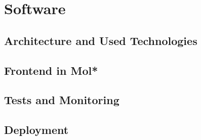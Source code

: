 \chapter{Software}
\label{chap:software}



\section{Architecture and Used Technologies}
\label{sec:architecture-technologies}



\section{Frontend in Mol*}
\label{sec:frontend-molstar}



\section{Tests and Monitoring}
\label{sec:tests-monitoring}



\section{Deployment}
\label{sec:deployment}

